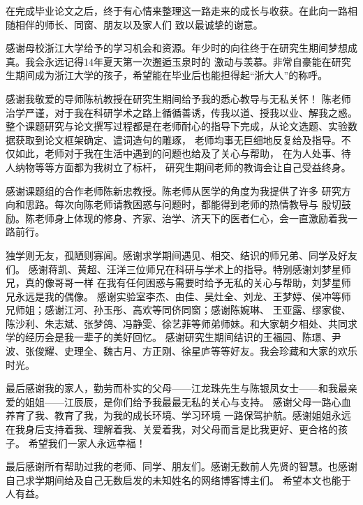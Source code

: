 \cleardoublepage
{}

在完成毕业论文之后，终于有心情来整理这一路走来的成长与收获。在此向一路相随相伴的师长、同窗、朋友以及家人们
致以最诚挚的谢意。

感谢母校浙江大学给予的学习机会和资源。年少时的向往终于在研究生期间梦想成真。我会永远记得14年夏天第一次邂逅玉泉时的
激动与羡慕。非常自豪能在研究生期间成为浙江大学的孩子，希望能在毕业后也能担得起“浙大人”的称呼。

感谢我敬爱的导师陈杭教授在研究生期间给予我的悉心教导与无私关怀！
陈老师治学严谨，对于我在科研学术之路上循循善诱，传我以道、授我以业、解我之惑。
整个课题研究与论文撰写过程都是在老师耐心的指导下完成，从论文选题、实验数据获取到论文框架确定、遣词造句的雕琢，
老师均事无巨细地反复给及指导。不仅如此，老师对于我在生活中遇到的问题也给及了关心与帮助，
在为人处事、待人纳物等等方面都为我树立了标杆，
研究生期间老师的教诲会让自己受益终身。


感谢课题组的合作老师陈新忠教授。陈老师从医学的角度为我提供了许多
研究方向和思路。每次向陈老师请教困惑与问题时，都能得到老师的热情教导与
殷切鼓励。陈老师身上体现的修身、齐家、治学、济天下的医者仁心，会一直激励着我一路前行。

独学则无友，孤陋则寡闻。感谢求学期间遇见、相交、结识的师兄弟、同学及好友们。
感谢蒋凯、黄超、汪洋三位师兄在科研与学术上的指导。特别感谢刘梦星师兄，真的像哥哥一样
在我有任何困惑与需要时给予无私的关心与帮助，刘梦星师兄永远是我的偶像。
感谢实验室李杰、由佳、吴灶全、刘龙、王梦婷、侯冲等师兄师姐；感谢江河、孙玉彤、高欢等同侪同窗；感谢陈婉琳、
王亚露、缪家俊、陈沙利、朱志斌、张梦鸽、冯静雯、徐艺菲等师弟师妹。和大家朝夕相处、共同求学的经历会是我一辈子的美好回忆。
感谢研究生期间结识的王福园、陈璟、尹波、张俊耀、史理全、魏古月、方正刚、徐星庐等等好友。我会珍藏和大家的欢乐时光。


最后感谢我的家人，勤劳而朴实的父母——江龙珠先生与陈银凤女士——和我最亲爱的姐姐——江辰辰，是你们给予我最最无私的关心与支持。
感谢父母一路心血养育了我、教育了我，为我的成长环境、学习环境
一路保驾护航。感谢姐姐永远在我身后支持着我、理解着我、关爱着我，对父母而言是比我更好、更合格的孩子。
希望我们一家人永远幸福！

最后感谢所有帮助过我的老师、同学、朋友们。感谢无数前人先贤的智慧。也感谢自己求学期间给及自己无数启发的未知姓名的网络博客博主们。
希望本文也能于人有益。


